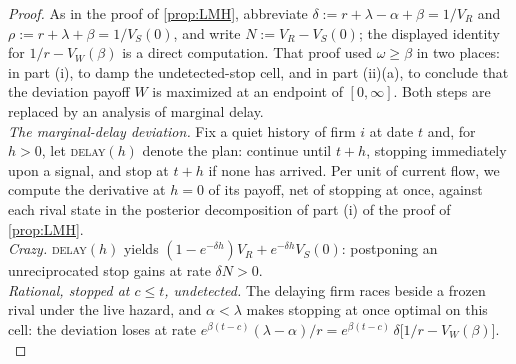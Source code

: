 \documentclass[12pt,reqno]{article}
\theoremstyle{definition} \newtheorem{example}{Example}
\theoremstyle{definition} \newtheorem{condition}{Condition}
\theoremstyle{definition} \newtheorem{corollary}{Corollary}
\theoremstyle{definition} \newtheorem{claim}{Claim}
\theoremstyle{definition} \newtheorem{definition}{Definition}
\theoremstyle{definition} \newtheorem{conjecture}{Conjecture}
\theoremstyle{definition} \newtheorem{Lemma}{Lemma}
\theoremstyle{definition} \newtheorem{lemma}{Lemma}
\theoremstyle{plain} \newtheorem{theorem}{Theorem}
\theoremstyle{definition} \newtheorem{assumption}{Assumption}
\theoremstyle{definition} \newtheorem*{assumptionnonumber}{Assumption}
\theoremstyle{definition} \newtheorem*{theoremNoNumber}{Proposition}
\theoremstyle{definition}
\theoremstyle{definition}\newtheorem{proposition}{Proposition}
\theoremstyle{definition} \newtheorem{result}{Result}
\theoremstyle{definition} \newtheorem*{definitionNoNumber}{Definition}
\theoremstyle{definition} \newtheorem{Definition}{Definition}
\theoremstyle{definition} \newtheorem*{DefinitionNoNumber}{Definition}
\theoremstyle{definition} \newtheorem*{fact}{Fact}
\theoremstyle{definition} \newtheorem*{property}{Property}
\theoremstyle{definition} \newtheorem{remark}{Remark}
\begin{document}
\begin{proof}
As in the proof of \cref{prop:LMH}, abbreviate $\delta:=r+\lambda-\alpha+\beta=1/V_R$ and $\rho:=r+\lambda+\beta=1/V_S(0)$, and write $N:=V_R-V_S(0)$; the displayed identity for $1/r-V_W(\beta)$ is a direct computation. That proof used $\omega\ge\beta$ in two places: in part (i), to damp the undetected-stop cell, and in part (ii)(a), to conclude that the deviation payoff $W$ is maximized at an endpoint of $[0,\infty]$. Both steps are replaced by an analysis of marginal delay. \\ 

\noindent \emph{The marginal-delay deviation.} Fix a quiet history of firm $i$ at date $t$ and, for $h>0$, let \textsc{delay}$(h)$ denote the plan: continue until $t+h$, stopping immediately upon a signal, and stop at $t+h$ if none has arrived. Per unit of current flow, we compute the derivative at $h=0$ of its payoff, net of stopping at once, against each rival state in the posterior decomposition of part (i) of the proof of \cref{prop:LMH}. \\ 

\noindent  \emph{Crazy.} \textsc{delay}$(h)$ yields $(1-e^{-\delta h})V_R+e^{-\delta h}V_S(0)$: postponing an unreciprocated stop gains at rate $\delta N>0$. \\ 

\noindent  \emph{Rational, stopped at $c\le t$, undetected.} The delaying firm races beside a frozen rival under the live hazard, and $\alpha<\lambda$ makes stopping at once optimal on this cell: the deviation loses at rate $e^{\beta(t-c)}(\lambda-\alpha)/r=e^{\beta(t-c)}\,\delta\big[1/r-V_W(\beta)\big]$. \\ 


\end{proof}
\end{document}
